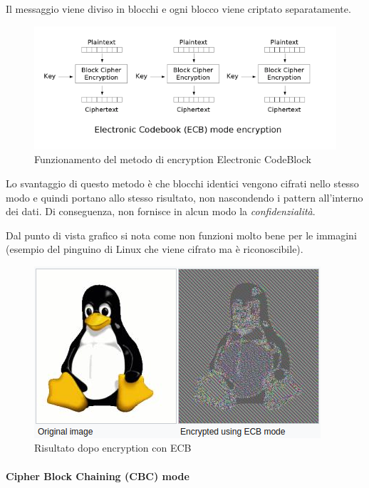 Il messaggio viene diviso in blocchi e ogni blocco viene criptato separatamente.

\begin{figure}[H]
\centering
\includegraphics[scale=0.65]{res/img/ecb.png}
\caption{Funzionamento del metodo di encryption Electronic CodeBlock}
\label{fig:password:ecb}
\end{figure}

Lo svantaggio di questo metodo è che blocchi identici vengono cifrati nello
stesso modo e quindi portano allo stesso risultato, non nascondendo i pattern
all'interno dei dati. Di conseguenza, non fornisce in alcun modo la
\textit{confidenzialità}.

Dal punto di vista grafico si nota come non funzioni molto bene per le
immagini (esempio del pinguino di Linux che viene cifrato ma è riconoscibile).

\begin{figure}[H]
\centering
\includegraphics[scale=0.65]{res/img/password_linux.png}
\caption{Risultato dopo encryption con ECB}
\label{fig:password:linux_ecb}
\end{figure}

\paragraph{Cipher Block Chaining (CBC) mode}

